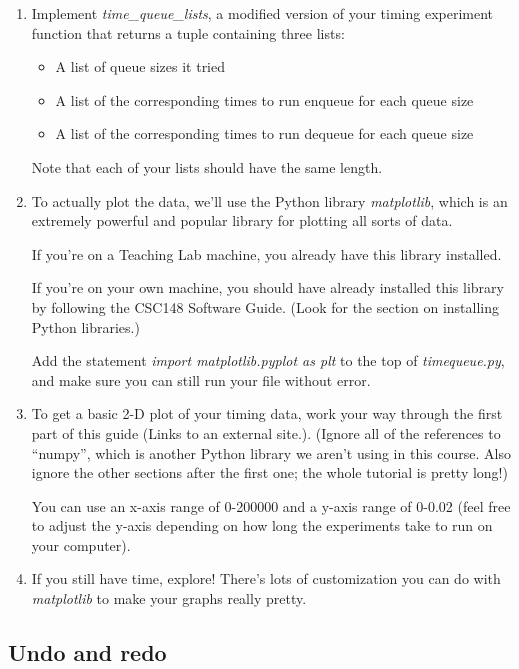 \documentclass[12pt]{article}
\begin{document}
\begin{enumerate}[1.]
    \item Implement \textit{time\_queue\_lists}, a modified version of your timing
    experiment function that returns a tuple containing three lists:

    \begin{itemize}
        \item A list of queue sizes it tried
        \item A list of the corresponding times to run enqueue for each queue size
        \item A list of the corresponding times to run dequeue for each queue size
    \end{itemize}

    \bigskip

    Note that each of your lists should have the same length.

    \item To actually plot the data, we’ll use the Python library \textit{matplotlib},
    which is an extremely powerful and popular library for plotting all sorts of
    data.

    \bigskip

    If you’re on a Teaching Lab machine, you already have this library installed.

    \bigskip

    If you’re on your own machine, you should have already installed this library
    by following the CSC148 Software Guide. (Look for the section on installing
    Python libraries.)

    \bigskip

    Add the statement \textit{import matplotlib.pyplot as plt} to the top of \textit{timequeue.py},
    and make sure you can still run your file without error.

    \bigskip

    \item To get a basic 2-D plot of your timing data, work your way through the
    first part of this guide (Links to an external site.). (Ignore all of the
    references to “numpy”, which is another Python library we aren’t using in this
    course. Also ignore the other sections after the first one; the whole tutorial
    is pretty long!)

    \bigskip

    You can use an x-axis range of 0-200000 and a y-axis range of 0-0.02 (feel
    free to adjust the y-axis depending on how long the experiments take to run
    on your computer).

    \item If you still have time, explore! There’s lots of customization you can
    do with \textit{matplotlib} to make your graphs really pretty.
\end{enumerate}
\subsection*{Undo and redo}
\end{document}
